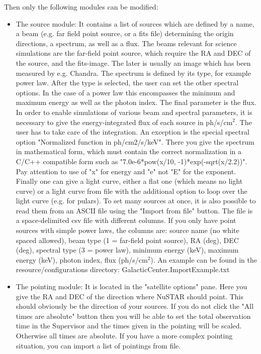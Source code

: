 Then only the following modules can be modified:
\begin{itemize}
\item The source module: 
It contains a list of sources which are defined by a name, a beam (e.g. far field point source, or a fits file) determining the origin directions, a spectrum, as well as a flux.
The beams relevant for science simulations are the far-field point source, which require the RA and DEC of the source, and the fits-image. The later is usually an image which has been measured by e.g. Chandra.
The spectrum is defined by its type, for example power law. 
After the type is selected, the user can set the other spectral options.
In the case of a power law this encompasses the minimum and maximum energy as well as the photon index.
The final parameter is the flux.
In order to enable simulations of various beam and spectral parameters, it is necessary to give the energy-integrated flux of each source in ph/s/cm$^2$. 
The user has to take care of the integration.
An exception is the special spectral option "Normalized function in ph/cm2/s/keV". 
There you give the spectrum in mathematical form, which must contain the correct normalization in a C/C++ compatible form such as "7.0e-6*pow(x/10, -1)*exp(-sqrt(x/2.2))".
Pay attention to use of "x" for energy and "e" not "E" for the exponent.
Finally one can give a light curve, either a flat one (which means no light curve) or a light curve from file with the additional option to loop over the light curve (e.g. for pulars).
To set many sources at once, it is also possible to read them from an ASCII file using the "Import from file" button. 
The file is a space-delimited csv file with different columns. If you only have point sources with simple power laws, the columns are: source name (no white spaced allowed), beam type (1 = far-field point source), RA (deg), DEC (deg), spectral type (3 = power law), minimum energy (keV), maximum energy (keV), photon index, flux (ph/s/cm$^2$).
An example can be found in the resource/configurations directory: GalacticCenter.ImportExample.txt
\item The pointing module: 
It is located in the "satellite options" pane. 
Here you give the RA and DEC of the direction where NuSTAR should point. 
This should obviously be the direction of your sources.
If you do not click the "All times are absolute" button then you will be able to set the total observation time in the Supervisor and the times given in the pointing will be scaled.
Otherwise all times are absolute. 
If you have a more complex pointing situation, you can import a list of pointings from file.

\end{itemize}
